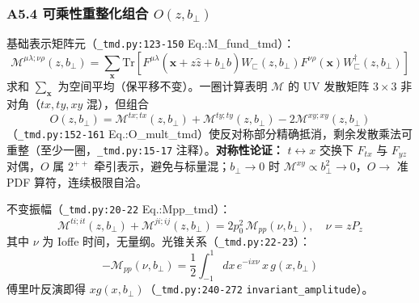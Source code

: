 \documentclass[UTF8]{ctexart}
\begin{document}
\subsubsection{A5.4 可乘性重整化组合 $O(z,b_\perp)$}
基础表示矩阵元（\texttt{\nolinkurl{\_tmd.py:123-150}} Eq.:M\_fund\_tmd）：
\begin{equation}
\mathcal{M}^{\mu\lambda;\nu\rho}(z,b_\perp)=\sum_{\mathbf{x}}\mathrm{Tr}\left[F^{\mu\lambda}(\mathbf{x}+z\hat z+b_\perp\hat b)W_\sqsubset(z,b_\perp)F^{\nu\rho}(\mathbf{x})W^\dagger_\sqsubset(z,b_\perp)\right]
\label{eq:Mfund}
\end{equation}
求和 $\sum_{\mathbf{x}}$ 为空间平均（保平移不变）。一圈计算表明 $\mathcal{M}$ 的 UV 发散矩阵 $3\times3$ 非对角（$tx,ty,xy$ 混），但组合
\begin{equation}
O(z,b_\perp)=\mathcal{M}^{tx;tx}(z,b_\perp)+\mathcal{M}^{ty;ty}(z,b_\perp)-2\mathcal{M}^{xy;xy}(z,b_\perp)
\label{eq:Odef}
\end{equation}
（\texttt{\nolinkurl{\_tmd.py:152-161}} Eq.:O\_mult\_tmd）使反对称部分精确抵消，剩余发散乘法可重整（至少一圈，\texttt{\nolinkurl{\_tmd.py:15-17}} 注释）。\textbf{对称性论证：} $t\leftrightarrow x$ 交换下 $F_{tx}$ 与 $F_{yz}$ 对偶，$O$ 属 $2^{++}$ 牵引表示，避免与标量混；$b_\perp\to0$ 时 $\mathcal{M}^{xy}\propto b_\perp^2\to0$，$O\to$ 准 PDF 算符，连续极限自洽。

不变振幅（\texttt{\nolinkurl{\_tmd.py:20-22}} Eq.:Mpp\_tmd）：
\begin{equation}
\mathcal{M}^{ti;it}(z,b_\perp)+\mathcal{M}^{ji;ij}(z,b_\perp)=2p_0^2\,\mathcal{M}_{pp}(\nu,b_\perp),\quad \nu=zP_z
\label{eq:Mpp}
\end{equation}
其中 $\nu$ 为 Ioffe 时间，无量纲。光锥关系（\texttt{\nolinkurl{\_tmd.py:22-23}}）：
\begin{equation}
-\mathcal{M}_{pp}(\nu,b_\perp)=\frac12\int_{-1}^1 dx\,e^{-ix\nu}\,x\,g(x,b_\perp)
\label{eq:MppPDF}
\end{equation}
傅里叶反演即得 $xg(x,b_\perp)$（\texttt{\nolinkurl{\_tmd.py:240-272}} \texttt{\nolinkurl{invariant\_amplitude}}）。
\end{document}
